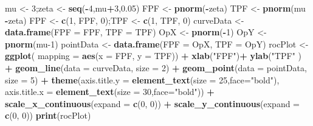 \documentclass[
]{book}
\newenvironment{Shaded}{\begin{snugshade}}{\end{snugshade}}
\newcommand{\DataTypeTok}[1]{\textcolor[rgb]{0.13,0.29,0.53}{#1}}
\newcommand{\DecValTok}[1]{\textcolor[rgb]{0.00,0.00,0.81}{#1}}
\newcommand{\FloatTok}[1]{\textcolor[rgb]{0.00,0.00,0.81}{#1}}
\newcommand{\KeywordTok}[1]{\textcolor[rgb]{0.13,0.29,0.53}{\textbf{#1}}}
\newcommand{\NormalTok}[1]{#1}
\newcommand{\OperatorTok}[1]{\textcolor[rgb]{0.81,0.36,0.00}{\textbf{#1}}}
\newcommand{\StringTok}[1]{\textcolor[rgb]{0.31,0.60,0.02}{#1}}
\begin{document}
\begin{Shaded}
\begin{Highlighting}[]
\NormalTok{mu \textless{}{-}}\StringTok{ }\DecValTok{3}\NormalTok{;zeta \textless{}{-}}\StringTok{ }\KeywordTok{seq}\NormalTok{(}\OperatorTok{{-}}\DecValTok{4}\NormalTok{,mu}\OperatorTok{+}\DecValTok{3}\NormalTok{,}\FloatTok{0.05}\NormalTok{)}
\NormalTok{FPF \textless{}{-}}\StringTok{ }\KeywordTok{pnorm}\NormalTok{(}\OperatorTok{{-}}\NormalTok{zeta)}
\NormalTok{TPF \textless{}{-}}\StringTok{ }\KeywordTok{pnorm}\NormalTok{(mu }\OperatorTok{{-}}\NormalTok{zeta) }
\NormalTok{FPF \textless{}{-}}\StringTok{ }\KeywordTok{c}\NormalTok{(}\DecValTok{1}\NormalTok{, FPF, }\DecValTok{0}\NormalTok{);TPF \textless{}{-}}\StringTok{ }\KeywordTok{c}\NormalTok{(}\DecValTok{1}\NormalTok{, TPF, }\DecValTok{0}\NormalTok{)}
\NormalTok{curveData \textless{}{-}}\StringTok{ }\KeywordTok{data.frame}\NormalTok{(}\DataTypeTok{FPF =}\NormalTok{ FPF, }\DataTypeTok{TPF =}\NormalTok{ TPF)}
\NormalTok{OpX \textless{}{-}}\StringTok{ }\KeywordTok{pnorm}\NormalTok{(}\OperatorTok{{-}}\DecValTok{1}\NormalTok{)}
\NormalTok{OpY \textless{}{-}}\StringTok{ }\KeywordTok{pnorm}\NormalTok{(mu}\DecValTok{{-}1}\NormalTok{)}
\NormalTok{pointData \textless{}{-}}\StringTok{ }\KeywordTok{data.frame}\NormalTok{(}\DataTypeTok{FPF =}\NormalTok{ OpX, }\DataTypeTok{TPF =}\NormalTok{ OpY)}
\NormalTok{rocPlot \textless{}{-}}\StringTok{ }\KeywordTok{ggplot}\NormalTok{(}
  \DataTypeTok{mapping =} \KeywordTok{aes}\NormalTok{(}\DataTypeTok{x =}\NormalTok{ FPF, }\DataTypeTok{y =}\NormalTok{ TPF)) }\OperatorTok{+}\StringTok{ }
\StringTok{  }\KeywordTok{xlab}\NormalTok{(}\StringTok{"FPF"}\NormalTok{)}\OperatorTok{+}\StringTok{ }\KeywordTok{ylab}\NormalTok{(}\StringTok{"TPF"}\NormalTok{ ) }\OperatorTok{+}\StringTok{ }
\StringTok{  }\KeywordTok{geom\_line}\NormalTok{(}\DataTypeTok{data =}\NormalTok{ curveData, }\DataTypeTok{size =} \DecValTok{2}\NormalTok{) }\OperatorTok{+}\StringTok{ }
\StringTok{  }\KeywordTok{geom\_point}\NormalTok{(}\DataTypeTok{data =}\NormalTok{ pointData, }\DataTypeTok{size =} \DecValTok{5}\NormalTok{) }\OperatorTok{+}
\StringTok{  }\KeywordTok{theme}\NormalTok{(}\DataTypeTok{axis.title.y =} \KeywordTok{element\_text}\NormalTok{(}\DataTypeTok{size =} \DecValTok{25}\NormalTok{,}\DataTypeTok{face=}\StringTok{"bold"}\NormalTok{),}
        \DataTypeTok{axis.title.x =} \KeywordTok{element\_text}\NormalTok{(}\DataTypeTok{size =} \DecValTok{30}\NormalTok{,}\DataTypeTok{face=}\StringTok{"bold"}\NormalTok{))  }\OperatorTok{+}
\StringTok{  }\KeywordTok{scale\_x\_continuous}\NormalTok{(}\DataTypeTok{expand =} \KeywordTok{c}\NormalTok{(}\DecValTok{0}\NormalTok{, }\DecValTok{0}\NormalTok{)) }\OperatorTok{+}\StringTok{ }
\StringTok{  }\KeywordTok{scale\_y\_continuous}\NormalTok{(}\DataTypeTok{expand =} \KeywordTok{c}\NormalTok{(}\DecValTok{0}\NormalTok{, }\DecValTok{0}\NormalTok{)) }
\KeywordTok{print}\NormalTok{(rocPlot)}
\end{Highlighting}
\end{Shaded}
\end{document}
